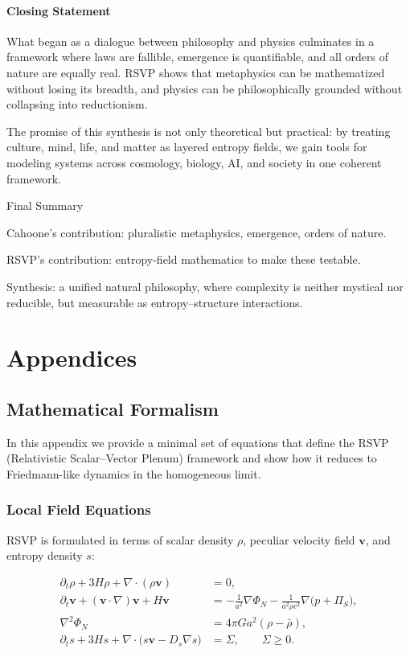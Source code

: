 \documentclass[12pt]{book}
\begin{document}
\subsection{Closing Statement}
What began as a dialogue between philosophy and physics culminates in a framework where laws are fallible, emergence is quantifiable, and all orders of nature are equally real. RSVP shows that metaphysics can be mathematized without losing its breadth, and physics can be philosophically grounded without collapsing into reductionism.

The promise of this synthesis is not only theoretical but practical: by treating culture, mind, life, and matter as layered entropy fields, we gain tools for modeling systems across cosmology, biology, AI, and society in one coherent framework.

Final Summary

Cahoone’s contribution: pluralistic metaphysics, emergence, orders of nature.

RSVP’s contribution: entropy-field mathematics to make these testable.

Synthesis: a unified natural philosophy, where complexity is neither mystical nor reducible, but measurable as entropy–structure interactions.

\part{Appendices}

\appendix

\chapter{Mathematical Formalism}

In this appendix we provide a minimal set of equations that define the RSVP
(Relativistic Scalar--Vector Plenum) framework and show how it reduces to
Friedmann-like dynamics in the homogeneous limit.

\section{Local Field Equations}

RSVP is formulated in terms of scalar density $\rho$, peculiar velocity field
$\mathbf{v}$, and entropy density $s$:

\begin{align}
\partial_t \rho + 3H\rho + \nabla \cdot (\rho \mathbf{v}) &= 0, \label{eq:cont} \\
\partial_t \mathbf{v} + (\mathbf{v}\cdot\nabla)\mathbf{v} + H\mathbf{v}
&= -\frac{1}{a^2}\nabla \Phi_N - \frac{1}{a^2 \rho c^2}\nabla\!\big(p+\Pi_S\big), \label{eq:euler} \\
\nabla^2 \Phi_N &= 4\pi G a^2 (\rho - \bar{\rho}), \label{eq:poisson} \\
\partial_t s + 3H s + \nabla \cdot \big(s \mathbf{v} - D_s \nabla s\big)
&= \Sigma, \qquad \Sigma \geq 0. \label{eq:entropy}
\end{align}
\end{document}
